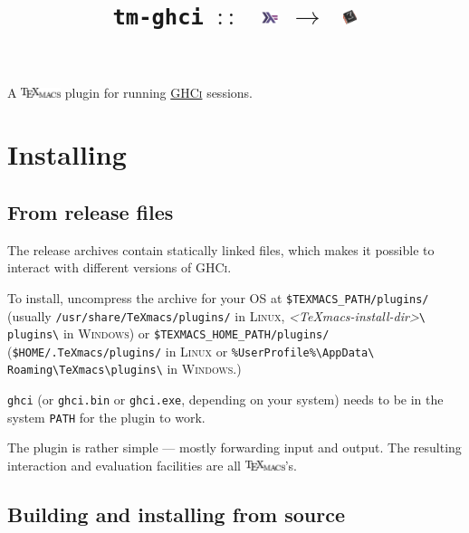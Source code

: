 \documentclass{article}
\newcommand{\TeXmacs}{\includegraphics[width=44px,height=11px]{texmacs-text.png}}
\renewcommand{\emph}[1]{\textit{#1}}
\begin{document}
\title{\texttt{tm-ghci\ $::$\ }
  \includegraphics[width=18px,height=16px]{haskell.png}
  $\mathtt{\rightarrow}$\ 
  \includegraphics[width=18px,height=16px]{texmacs.png}}

\author{}
\date{}

\maketitle

A \href{https://texmacs.org/}{\TeXmacs} plugin for running
\href{https://wiki.haskell.org/GHC/GHCi}{\textsc{GHCi}} sessions.

\section{Installing}

\subsection{From release files}

The release archives contain statically linked files, which makes it possible
to interact with different versions of {\textsc{GHCi}}.

To install, uncompress the archive for your \textsc{OS} at
\texttt{\$TEXMACS\_PATH/plugins/}  (usually
\texttt{/usr/share/TeXmacs/plugins/}  in  \textsc{Linux},
\emph{\textless\textsf{TeXmacs-install-dir}\textgreater}\texttt{\textbackslash
plugins\textbackslash} in \textsc{Windows}) or
\texttt{\$TEXMACS\_HOME\_PATH/plugins/}
(\texttt{\$HOME/.TeXmacs/plugins/} in \textsc{Linux} or
\texttt{\%UserProfile\%\textbackslash AppData\textbackslash
Roaming\textbackslash TeXmacs\textbackslash plugins\textbackslash} in
\textsc{Windows}.)

\texttt{ghci} (or \texttt{ghci.bin} or \texttt{ghci.exe}, depending
on your system) needs to be in the system \texttt{PATH} for the plugin to work.

The plugin is rather simple --- mostly forwarding input and output. The
resulting interaction and evaluation facilities are all {\TeXmacs}'s.

\subsection{Building and installing from source}
\end{document}
